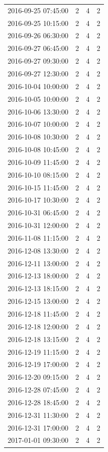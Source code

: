\begin{tabular}{lrrr}
2016-09-25 07:45:00 & 2 & 4 & 2 \\
2016-09-25 10:15:00 & 2 & 4 & 2 \\
2016-09-26 06:30:00 & 2 & 4 & 2 \\
2016-09-27 06:45:00 & 2 & 4 & 2 \\
2016-09-27 09:30:00 & 2 & 4 & 2 \\
2016-09-27 12:30:00 & 2 & 4 & 2 \\
2016-10-04 10:00:00 & 2 & 4 & 2 \\
2016-10-05 10:00:00 & 2 & 4 & 2 \\
2016-10-06 13:30:00 & 2 & 4 & 2 \\
2016-10-07 10:00:00 & 2 & 4 & 2 \\
2016-10-08 10:30:00 & 2 & 4 & 2 \\
2016-10-08 10:45:00 & 2 & 4 & 2 \\
2016-10-09 11:45:00 & 2 & 4 & 2 \\
2016-10-10 08:15:00 & 2 & 4 & 2 \\
2016-10-15 11:45:00 & 2 & 4 & 2 \\
2016-10-17 10:30:00 & 2 & 4 & 2 \\
2016-10-31 06:45:00 & 2 & 4 & 2 \\
2016-10-31 12:00:00 & 2 & 4 & 2 \\
2016-11-08 11:15:00 & 2 & 4 & 2 \\
2016-12-08 13:30:00 & 2 & 4 & 2 \\
2016-12-11 13:00:00 & 2 & 4 & 2 \\
2016-12-13 18:00:00 & 2 & 4 & 2 \\
2016-12-13 18:15:00 & 2 & 4 & 2 \\
2016-12-15 13:00:00 & 2 & 4 & 2 \\
2016-12-18 11:45:00 & 2 & 4 & 2 \\
2016-12-18 12:00:00 & 2 & 4 & 2 \\
2016-12-18 13:15:00 & 2 & 4 & 2 \\
2016-12-19 11:15:00 & 2 & 4 & 2 \\
2016-12-19 17:00:00 & 2 & 4 & 2 \\
2016-12-20 09:15:00 & 2 & 4 & 2 \\
2016-12-28 07:45:00 & 2 & 4 & 2 \\
2016-12-28 18:45:00 & 2 & 4 & 2 \\
2016-12-31 11:30:00 & 2 & 4 & 2 \\
2016-12-31 17:00:00 & 2 & 4 & 2 \\
2017-01-01 09:30:00 & 2 & 4 & 2 \\

\end{tabular}
